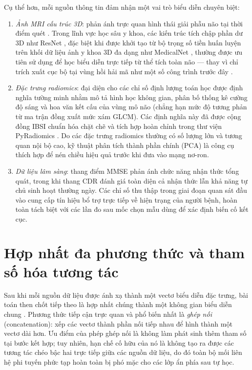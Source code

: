 Cụ thể hơn, mỗi nguồn thông tin đảm nhận một vai trò biểu diễn chuyên biệt:
\begin{enumerate}
\item \emph{Ảnh MRI cấu trúc 3D}: phản ánh trực quan hình thái giải phẫu não tại thời điểm quét \cite{jack2008adnimri}. Trong lĩnh vực học sâu y khoa, các kiến trúc tích chập phần dư 3D như ResNet \cite{he2016deep}, đặc biệt khi được khởi tạo từ bộ trọng số tiền huấn luyện trên khối dữ liệu ảnh y khoa 3D đa dạng như MedicalNet \cite{chen2019med3d}, thường được ưu tiên sử dụng để học biểu diễn trực tiếp từ thể tích toàn não — thay vì chỉ trích xuất cục bộ tại vùng hồi hải mã như một số công trình trước đây \cite{li2019hippocampal}.
\item \emph{Đặc trưng radiomics}: đại diện cho các chỉ số định lượng toán học được định nghĩa tường minh nhằm mô tả hình học không gian, phân bố thống kê cường độ sáng và hoa văn kết cấu của vùng mô não (chẳng hạn mức độ tương phản từ ma trận đồng xuất mức xám GLCM). Các định nghĩa này đã được cộng đồng IBSI chuẩn hóa chặt chẽ \cite{zwanenburg2020ibsi} và tích hợp hoàn chỉnh trong thư viện PyRadiomics \cite{vangriethuysen2017computational}. Do các đặc trưng radiomics thường có số lượng lớn và tương quan nội bộ cao, kỹ thuật phân tích thành phần chính (PCA) \cite{jolliffe2016pca} là công cụ thích hợp để nén chiều hiệu quả trước khi đưa vào mạng nơ-ron.
\item \emph{Dữ liệu lâm sàng}: thang điểm MMSE \cite{folstein1975mmse} phản ánh chức năng nhận thức tổng quát, trong khi thang CDR \cite{morris1993cdr} đánh giá toàn diện cả nhận thức lẫn khả năng tự chủ sinh hoạt thường ngày. Các chỉ số thu thập trong giai đoạn quan sát đầu vào cung cấp tín hiệu bổ trợ trực tiếp về hiện trạng của người bệnh, hoàn toàn tách biệt với các lần đo sau mốc chọn mẫu dùng để xác định biến cố kết cục.
\end{enumerate}

\section{Hợp nhất đa phương thức và tham số hóa tương tác}
\label{sec:background-fusion}
Sau khi mỗi nguồn dữ liệu được ánh xạ thành một vectơ biểu diễn đặc trưng, bài toán then chốt tiếp theo là hợp nhất chúng thành một không gian biểu diễn chung \cite{baltrusaitis2019multimodal}. Phương thức tiếp cận trực quan và phổ biến nhất là \emph{ghép nối} (concatenation): xếp các vectơ thành phần nối tiếp nhau để hình thành một vectơ dài hơn. Ưu điểm của phép ghép nối là không làm phát sinh thêm tham số tại bước kết hợp; tuy nhiên, hạn chế cố hữu của nó là không tạo ra được các tương tác chéo bậc hai trực tiếp giữa các nguồn dữ liệu, do đó toàn bộ mối liên hệ phi tuyến phức tạp hoàn toàn bị phó mặc cho các lớp ẩn phía sau tự học.

